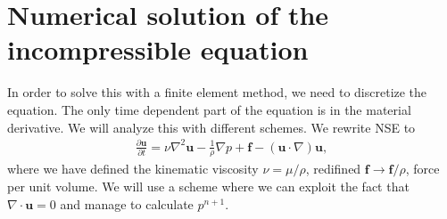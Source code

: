 \documentclass[a4paper,10pt]{article}
\renewcommand{\vec}[1]{\mathbf{#1}}
\renewcommand{\(}{\left(}
\renewcommand{\)}{\right)}
\newcommand{\dpart}[2]{\frac{\partial#1}{\partial#2}}
\begin{document}
\section{Numerical solution of the incompressible equation}
In order to solve this with a finite element method, we need to discretize the equation. The only time dependent part of the equation is in the material derivative. We will analyze this with different schemes. We rewrite NSE to
\begin{align*}
  \dpart{\vec u}{t} = \nu\nabla^2\vec u - \frac{1}{\rho}\nabla p + \vec f - (\vec u\cdot \nabla)\vec u,
\end{align*}
where we have defined the kinematic viscosity $\nu=\mu/\rho$, redifined $\vec f \rightarrow \vec f/\rho$, force per unit volume. We will use a scheme where we can exploit the fact that $\nabla \cdot \vec u = 0$ and manage to calculate $p^{n+1}$.
\end{document}
